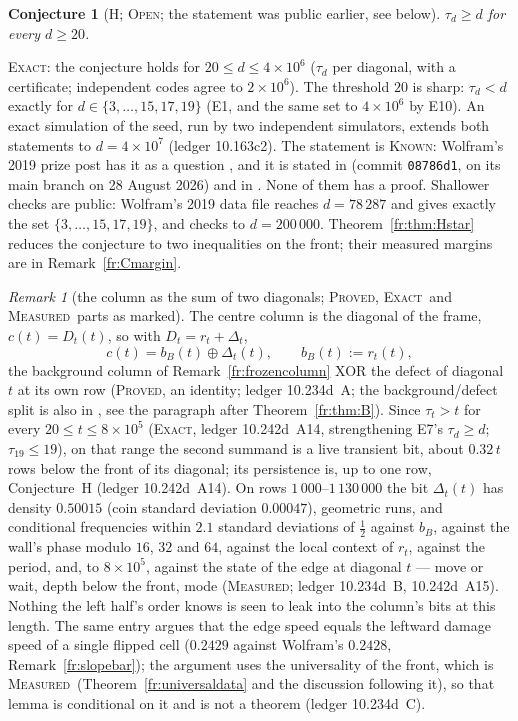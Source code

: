 \documentclass[11pt]{article}
\newtheorem{conjecture}[theorem]{Conjecture}
\theoremstyle{definition}
\theoremstyle{remark}
\newtheorem{remark}[theorem]{Remark}
\newcommand{\PROVED}{\textsc{Proved}}
\newcommand{\EXACT}{\textsc{Exact}}
\newcommand{\MEASURED}{\textsc{Measured}}
\newcommand{\KNOWN}{\textsc{Known}}
\newcommand{\OPEN}{\textsc{Open}}
\begin{document}
\begin{conjecture}[H; \OPEN; the statement was public earlier, see below]\label{fr:conj:H}
$\tau_d\ge d$ for every $d\ge20$.
\end{conjecture}
\noindent\EXACT: the conjecture holds for $20\le d\le4\times10^{6}$ ($\tau_d$ per diagonal, with a certificate; independent
codes agree to $2\times10^{6}$). The threshold $20$ is sharp: $\tau_d<d$ exactly for $d\in\{3,\dots,15,17,19\}$ (E1, and the
same set to $4\times10^{6}$ by E10). An exact simulation of the seed, run by two independent simulators, extends both statements to $d=4\times10^{7}$ (ledger 10.163c2). The statement is \KNOWN: Wolfram's 2019 prize post has it as a question \cite{Wolfram}, and it is stated in \cite{Pat} (commit \texttt{08786d1}, on its main branch on 28 August 2026) and in \cite{Dib}. None of them has a proof. Shallower checks are public: Wolfram's 2019 data file \cite{Wolfram19} reaches $d=78\,287$ and gives exactly the set $\{3,\dots,15,17,19\}$, and \cite{Dib} checks to $d=200\,000$. Theorem~\ref{fr:thm:Hstar} reduces the conjecture to two inequalities on the front; their measured margins are in Remark~\ref{fr:Cmargin}.

\begin{remark}[the column as the sum of two diagonals; \PROVED, \EXACT\ and \MEASURED\ parts as marked]\label{fr:middle}
The centre column is the diagonal of the frame, $c(t)=D_t(t)$, so with $D_t=r_t+\Delta_t$,
\[
c(t)=b_B(t)\oplus\Delta_t(t),\qquad b_B(t):=r_t(t),
\]
the background column of Remark~\ref{fr:frozencolumn} XOR the defect of diagonal $t$ at its own row (\PROVED, an identity; ledger 10.234d~A; the background/defect split is also in \cite{Dib}, see the paragraph after Theorem~\ref{fr:thm:B}). Since $\tau_t>t$ for every $20\le t\le8\times10^{5}$ (\EXACT, ledger 10.242d~A14, strengthening E7's $\tau_d\ge d$; $\tau_{19}\le19$), on that range the second summand is a live transient bit, about $0.32\,t$ rows below the front of its diagonal; its persistence is, up to one row, Conjecture~H (ledger 10.242d~A14). On rows $1\,000$--$1\,130\,000$ the bit $\Delta_t(t)$ has density $0.50015$ (coin standard deviation $0.00047$), geometric runs, and conditional frequencies within $2.1$ standard deviations of $\tfrac12$ against $b_B$, against the wall's phase modulo $16$, $32$ and $64$, against the local context of $r_t$, against the period, and, to $8\times10^{5}$, against the state of the edge at diagonal $t$ --- move or wait, depth below the front, mode (\MEASURED; ledger 10.234d~B, 10.242d~A15). Nothing the left half's order knows is seen to leak into the column's bits at this length. The same entry argues that the edge speed equals the leftward damage speed of a single flipped cell ($0.2429$ against Wolfram's $0.2428$, Remark~\ref{fr:slopebar}); the argument uses the universality of the front, which is \MEASURED\ (Theorem~\ref{fr:universaldata} and the discussion following it), so that lemma is conditional on it and is not a theorem (ledger 10.234d~C).
\end{remark}
\end{document}
